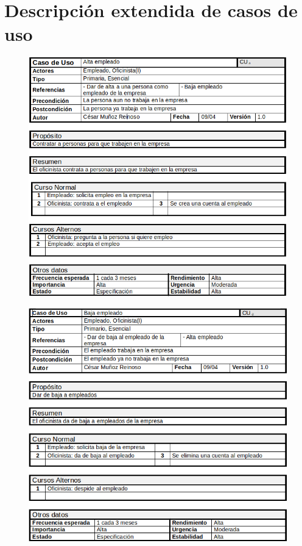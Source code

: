 \section{Descripción extendida de casos de uso}
\begin{figure}[H]
	\centering
	\includegraphics[width=16cm]{1}
\end{figure}
\begin{figure}[H]
	\centering
	\includegraphics[width=16cm]{2}
\end{figure}
